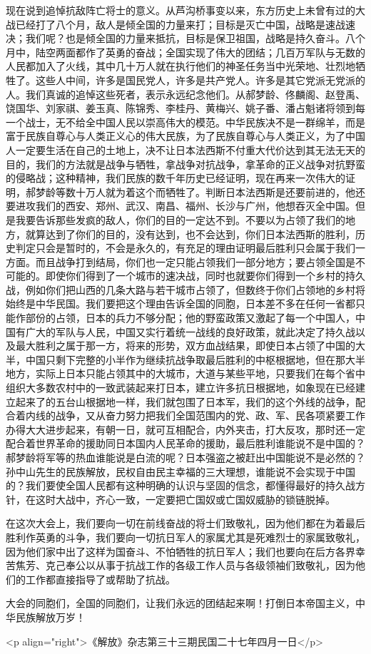 现在说到追悼抗敌阵亡将士的意义。从芦沟桥事变以来，东方历史上未曾有过的大战已经打了八个月，敌人是倾全国的力量来打；目标是灭亡中国，战略是速战速决；我们呢？也是倾全国的力量来抵抗，目标是保卫祖国，战略是持久奋斗。八个月中，陆空两面都作了英勇的奋战；全国实现了伟大的团结；几百万军队与无数的人民都加入了火线，其中几十万人就在执行他们的神圣任务当中光荣地、壮烈地牺牲了。这些人中间，许多是国民党人，许多是共产党人。许多是其它党派无党派的人。我们真诚的追悼这些死者，表示永远纪念他们。从郝梦龄、佟麟阁、赵登禹、饶国华、刘家祺、姜玉真、陈锦秀、李桂丹、黄梅兴、姚子番、潘占魁诸将领到每一个战士，无不给全中国人民以崇高伟大的模范。中华民族决不是一群绵羊，而是富于民族自尊心与人类正义心的伟大民族，为了民族自尊心与人类正义，为了中国人一定要生活在自己的土地上，决不让日本法西斯不付重大代价达到其无法无天的目的，我们的方法就是战争与牺牲，拿战争对抗战争，拿革命的正义战争对抗野蛮的侵略战；这种精神，我们民族的数千年历史已经证明，现在再来一次伟大的证明，郝梦龄等数十万人就为着这个而牺牲了。判断日本法西斯是还要前进的，他还要进攻我们的西安、郑州、武汉、南昌、福州、长沙与广州，他想吞灭全中国。但是我要告诉那些发疯的敌人，你们的目的一定达不到。不要以为占领了我们的地方，就算达到了你们的目的，没有达到，也不会达到，你们日本法西斯的胜利，历史判定只会是暂时的，不会是永久的，有充足的理由证明最后胜利只会属于我们一方面。而且战争打到结局，你们也一定只能占领我们一部分地方；要占领全国是不可能的。即使你们得到了一个城市的速决战，同时也就要你们得到一个乡村的持久战，例如你们把山西的几条大路与若干城市占领了，但数终于你们占领地的乡村将始终是中华民国。我们要把这个理由告诉全国的同胞，日本差不多在任何一省都只能作部份的占领，日本的兵力不够分配；他的野蛮政策又激起了每一个中国人，中国有广大的军队与人民，中国又实行着统一战线的良好政策，就此决定了持久战以及最大胜利之属于那一方，将来的形势，双方血战结果，即使日本占领了中国的大半，中国只剩下完整的小半作为继续抗战争取最后胜利的中枢根据地，但在那大半地方，实际上日本只能占领其中的大城市，大道与某些平地，只要我们在每个省中组织大多数农村中的一致武装起来打日本，建立许多抗日根据地，如象现在已经建立起来了的五台山根据地一样，我们就包围了日本军，我们的这个外线的战争，配合着内线的战争，又从奋力努力把我们全国范围内的党、政、军、民各项紧要工作办得大大进步起来，有朝一日，就可互相配合，内外夹击，打大反攻，那时还一定配合着世界革命的援助同日本国内人民革命的援助，最后胜利谁能说不是中国的？郝梦龄将军等的热血谁能说是白流的呢？日本强盗之被赶出中国能说不是必然的？孙中山先生的民族解放，民权自由民主幸福的三大理想，谁能说不会实现于中国的？我们要使全国人民都有这种明确的认识与坚固的信念，都懂得最好的持久战方针，在这时大战中，齐心一致，一定要把亡国奴或亡国奴威胁的锁链脱掉。

在这次大会上，我们要向一切在前线奋战的将士们致敬礼，因为他们都在为着最后胜利作英勇的斗争，我们要向一切抗日军人的家属尤其是死难烈士的家属致敬礼，因为他们家中出了这样为国奋斗、不怕牺牲的抗日军人；我们也要向在后方各界幸苦焦芳、克己奉公以从事于抗战工作的各级工作人员与各级领袖们致敬礼，因为他们的工作都直接指导了或帮助了抗战。

大会的同胞们，全国的同胞们，让我们永远的团结起来啊！打倒日本帝国主义，中华民族解放万岁！

<p align="right">《解放》杂志第三十三期民国二十七年四月一日</p>

